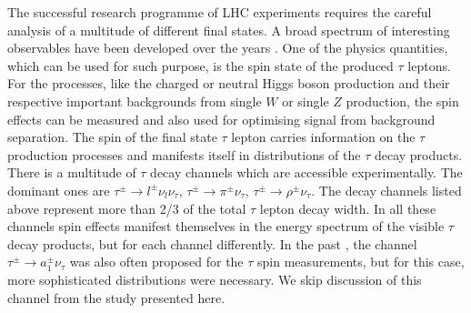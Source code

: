 \documentclass{article}
\begin{document}
The successful research programme of LHC experiments requires the careful 
analysis of a multitude of different final states. 
A broad spectrum of interesting observables have been  
developed over the years \cite{Aad:2009wy,Chatrchyan:2008aa,Alves:2008zz}. One of the physics quantities, which can be used 
for such purpose, is the spin state of the produced $\tau$ leptons.
For the processes, like the charged or neutral Higgs boson production and 
their respective important backgrounds from single $W$ or single $Z$ production,
the spin effects can be measured \cite{Aad:2012cia,Deigaard:2012fqa}
and also used for optimising signal from background separation.  
The spin of the final state $\tau$ lepton
carries information on the  $\tau$ production processes
and manifests itself in  distributions of the $\tau$ decay products.
There is a multitude of $\tau$ decay channels which are accessible experimentally. The dominant ones are 
$\tau^\pm \to l^\pm \nu_l\nu_\tau$,  $\tau^\pm \to \pi^\pm \nu_\tau$, 
$\tau^\pm \to \rho^\pm \nu_\tau$. 
The decay channels listed above represent more than 2/3 of the total $\tau$ lepton decay width. 
In all these channels spin effects 
manifest themselves in the energy spectrum of the visible $\tau$ decay products, 
but for each channel differently.
In the past \cite{Harton:1995dj,Heister:2001uh}, the channel $\tau^\pm \to a_1^\pm \nu_\tau$ was also 
often proposed for the $\tau$ 
spin measurements, but for this case, more sophisticated distributions
were necessary.
We skip discussion of this channel
from the study presented here.
\end{document}
